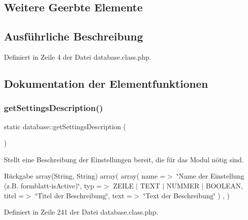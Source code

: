 \subsection*{Weitere Geerbte Elemente}


\subsection{Ausführliche Beschreibung}


Definiert in Zeile 4 der Datei database.\+class.\+php.



\subsection{Dokumentation der Elementfunktionen}
\mbox{\label{classdatabase_af4761528eebd534762e04a918ab26f70}} 
\subsubsection{\texorpdfstring{get\+Settings\+Description()}{getSettingsDescription()}}
{\footnotesize\ttfamily static database\+::get\+Settings\+Description (\begin{DoxyParamCaption}{ }\end{DoxyParamCaption})\hspace{0.3cm}{\ttfamily [static]}}

Stellt eine Beschreibung der Einstellungen bereit, die für das Modul nötig sind. \begin{DoxyReturn}{Rückgabe}
array(\+String, String) array( array( \textquotesingle{}name\textquotesingle{} =$>$ \char`\"{}\+Name der Einstellung (z.\+B. formblatt-\/is\+Active)\char`\"{}, \textquotesingle{}typ\textquotesingle{} =$>$ Z\+E\+I\+LE $\vert$ T\+E\+XT $\vert$ N\+U\+M\+M\+ER $\vert$ B\+O\+O\+L\+E\+AN, \textquotesingle{}titel\textquotesingle{} =$>$ \char`\"{}\+Titel der Beschreibung\char`\"{}, \textquotesingle{}text\textquotesingle{} =$>$ \char`\"{}\+Text der Beschreibung\char`\"{} ) , ) 
\end{DoxyReturn}


Definiert in Zeile 241 der Datei database.\+class.\+php.

\mbox{\label{classdatabase_a9db9a8cf32d2dea7e5120ceb2b0d603d}} 
